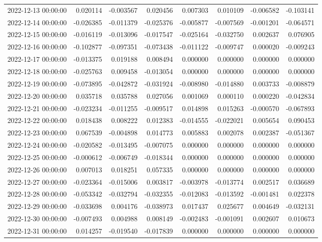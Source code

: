 \begin{tabular}{lrrrrrrr}
2022-12-13 00:00:00 & 0.020114 & -0.003567 & 0.020456 & 0.007303 & 0.010109 & -0.006582 & -0.103141 \\
2022-12-14 00:00:00 & -0.026385 & -0.011379 & -0.025376 & -0.005877 & -0.007569 & -0.001201 & -0.064571 \\
2022-12-15 00:00:00 & -0.016119 & -0.013096 & -0.017547 & -0.025164 & -0.032750 & 0.002637 & 0.076905 \\
2022-12-16 00:00:00 & -0.102877 & -0.097351 & -0.073438 & -0.011122 & -0.009747 & 0.000020 & -0.009243 \\
2022-12-17 00:00:00 & -0.013375 & 0.019188 & 0.008494 & 0.000000 & 0.000000 & 0.000000 & 0.000000 \\
2022-12-18 00:00:00 & -0.025763 & 0.009458 & -0.013054 & 0.000000 & 0.000000 & 0.000000 & 0.000000 \\
2022-12-19 00:00:00 & -0.073895 & -0.042872 & -0.031924 & -0.008980 & -0.014880 & 0.003733 & -0.008879 \\
2022-12-20 00:00:00 & 0.035718 & 0.035788 & 0.027056 & 0.001069 & 0.000110 & 0.000220 & -0.042834 \\
2022-12-21 00:00:00 & -0.023234 & -0.011255 & -0.009517 & 0.014898 & 0.015263 & -0.000570 & -0.067893 \\
2022-12-22 00:00:00 & 0.018438 & 0.008222 & 0.012383 & -0.014555 & -0.022021 & 0.005654 & 0.090453 \\
2022-12-23 00:00:00 & 0.067539 & -0.004898 & 0.014773 & 0.005883 & 0.002078 & 0.002387 & -0.051367 \\
2022-12-24 00:00:00 & -0.020582 & -0.013495 & -0.007075 & 0.000000 & 0.000000 & 0.000000 & 0.000000 \\
2022-12-25 00:00:00 & -0.000612 & -0.006749 & -0.018344 & 0.000000 & 0.000000 & 0.000000 & 0.000000 \\
2022-12-26 00:00:00 & 0.007013 & 0.018251 & 0.057335 & 0.000000 & 0.000000 & 0.000000 & 0.000000 \\
2022-12-27 00:00:00 & -0.023364 & -0.015006 & 0.003817 & -0.003978 & -0.013774 & 0.002517 & 0.036689 \\
2022-12-28 00:00:00 & -0.053342 & -0.032794 & -0.032355 & -0.012083 & -0.013592 & -0.001481 & 0.022378 \\
2022-12-29 00:00:00 & -0.033698 & 0.004176 & -0.038973 & 0.017437 & 0.025677 & 0.004649 & -0.032131 \\
2022-12-30 00:00:00 & -0.007493 & 0.004988 & 0.008149 & -0.002483 & -0.001091 & 0.002607 & 0.010673 \\
2022-12-31 00:00:00 & 0.014257 & -0.019540 & -0.017839 & 0.000000 & 0.000000 & 0.000000 & 0.000000 \\

\end{tabular}
